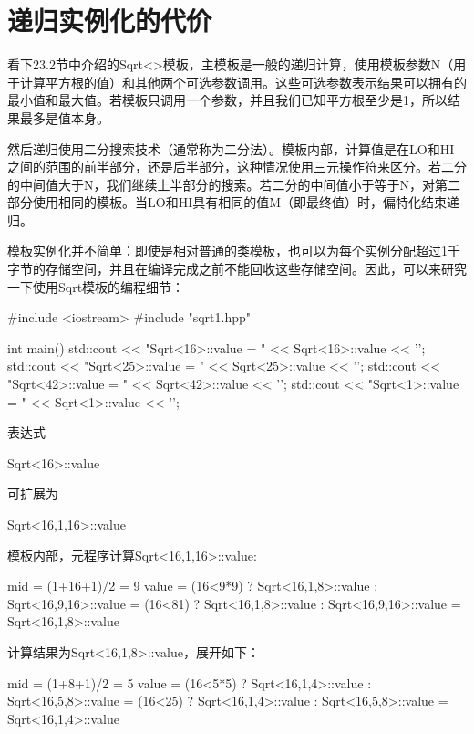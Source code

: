 \section{递归实例化的代价}

看下23.2节中介绍的Sqrt<>模板，主模板是一般的递归计算，使用模板参数N（用于计算平方根的值）和其他两个可选参数调用。这些可选参数表示结果可以拥有的最小值和最大值。若模板只调用一个参数，并且我们已知平方根至少是1，所以结果最多是值本身。

然后递归使用二分搜索技术（通常称为二分法）。模板内部，计算值是在LO和HI之间的范围的前半部分，还是后半部分，这种情况使用三元操作符来区分。若二分的中间值大于N，我们继续上半部分的搜索。若二分的中间值小于等于N，对第二部分使用相同的模板。当LO和HI具有相同的值M（即最终值）时，偏特化结束递归。

模板实例化并不简单：即使是相对普通的类模板，也可以为每个实例分配超过1千字节的存储空间，并且在编译完成之前不能回收这些存储空间。因此，可以来研究一下使用Sqrt模板的编程细节：

\begin{cpp}
#include <iostream>
#include "sqrt1.hpp"

int main()
{
	std::cout << "Sqrt<16>::value = " << Sqrt<16>::value << '\n';
	std::cout << "Sqrt<25>::value = " << Sqrt<25>::value << '\n';
	std::cout << "Sqrt<42>::value = " << Sqrt<42>::value << '\n';
	std::cout << "Sqrt<1>::value = " << Sqrt<1>::value << '\n';
}
\end{cpp}

表达式

\begin{cpp}
Sqrt<16>::value
\end{cpp}

可扩展为

\begin{cpp}
Sqrt<16,1,16>::value
\end{cpp}

模板内部，元程序计算Sqrt<16,1,16>::value:

\begin{cpp}
mid = (1+16+1)/2
	= 9
value = (16<9*9) ? Sqrt<16,1,8>::value
				: Sqrt<16,9,16>::value
	  = (16<81) ? Sqrt<16,1,8>::value
				: Sqrt<16,9,16>::value
	  = Sqrt<16,1,8>::value
\end{cpp}

计算结果为Sqrt<16,1,8>::value，展开如下：

\begin{cpp}
mid = (1+8+1)/2
	= 5
value = (16<5*5) ? Sqrt<16,1,4>::value
				: Sqrt<16,5,8>::value
	  = (16<25) ? Sqrt<16,1,4>::value
				: Sqrt<16,5,8>::value
	  = Sqrt<16,1,4>::value
\end{cpp}

